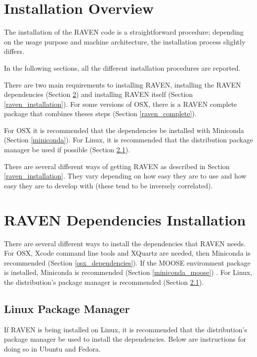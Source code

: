 \section{Installation Overview}

The installation of the RAVEN code is a straightforward procedure;
depending on the usage purpose and machine architecture, the
installation process slightly differs.

In the following sections, all the different installation procedures
are reported.

There are two main requirements to installing RAVEN, installing the
RAVEN dependencies (Section \ref{raven_dependencies}) and installing
RAVEN itself (Section \ref{raven_installation}).  For some versions of
OSX, there is a RAVEN complete package that combines theses steps
(Section \ref{raven_complete}).

For OSX it is recommended that the dependencies be installed with
Miniconda (Section \ref{miniconda}).  For Linux, it is recommended
that the distribution package manager be used if possible (Section
\ref{linux_package_manager}).

There are several different ways of getting RAVEN as described in
Section \ref{raven_installation}.  They vary depending on how easy
they are to use and how easy they are to develop with (these tend to
be inversely correlated).

\newcommand{\goToRavenInstallation}{Now go on to Section \ref{raven_installation} for Raven installation.
}


\section{RAVEN Dependencies Installation}
\label{raven_dependencies}

There are several different ways to install the dependencies that
RAVEN needs.  For OSX, Xcode command line tools and XQuartz are
needed, then Miniconda is recommended (Section
\ref{osx_dependencies}).  If the MOOSE environment package is
installed, Miniconda is recommended (Section \ref{miniconda_moose}) .
For Linux, the distribution's package manager is recommended (Section
\ref{linux_package_manager}).

\subsection{Linux Package Manager}
\label{linux_package_manager}

If RAVEN is being installed on Linux, it is recommended that the
distribution's package manager be used to install the dependencies.
Below are instructions for doing so in Ubuntu and Fedora.

